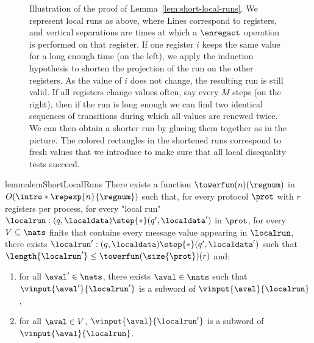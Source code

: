 \begin{figure}
	
	\caption{Illustration of the proof of Lemma~\ref{lem:short-local-runs}. We represent local runs as above, where Lines correspond to registers, and vertical separations are times at which a $\enregact$ operation is performed on that register. If one register $i$ keeps the same value for a long enough time (on the left), we apply the induction hypothesis to shorten the projection of the run on the other registers. As the value of $i$ does not change, the resulting run is still valid. If all registers change values often, say every $M$ steps (on the right), then if the run is long enough we can find two identical sequences of transitions during which all values are renewed twice. We can then obtain a shorter run by glueing them together as in the picture. The colored rectangles in the shortened runs correspond to fresh values that we introduce to make sure that all local disequality tests succeed.}
\end{figure}
\begin{restatable}{lemma}{lemShortLocalRuns}
	\label{lem:short-local-runs}
	There exists a function $\towerfun(n) (\regnum)$ in $O(\intro*\repexp{n}{\regnum})$ such that, for every protocol $\prot$ with $r$ registers per process, for every "local run" $\localrun: (q, \localdata) \step{*} (q', \localdata')$ in $\prot$, for every $V \subseteq \nats$ finite that contains every message value appearing in $\localrun$, there exists $\localrun': (q, \localdata) \step{*} (q', \localdata')$ such that $\length{\localrun'} \leq \towerfun(\size{\prot})(r)$ and:
	\begin{enumerate}
		\item \label{item:shorterrun_anyvalue} for all $\aval' \in \nats$, there exists $\aval \in \nats$ such that $\vinput{\aval'}{\localrun'}$ is a subword of $\vinput{\aval}{\localrun}$,
		\item \label{item:shorterrun_oldvalues} for all $\aval \in V$, $\vinput{\aval}{\localrun'}$ is a subword of $\vinput{\aval}{\localrun}$. 
	\end{enumerate}
\end{restatable}

